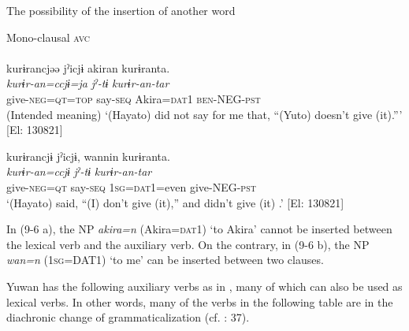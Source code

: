 \ea   The possibility of the insertion of another word \label{ex:9.6}

  \ea \label{ex:9.6a}Mono-clausal \textsc{avc}\\\\
 \glll  *kurɨrancjəə  jˀicjɨ  akiran  kurɨranta.\\
    \textit{kurɨr-an=ccjɨ=ja}  \textit{jˀ-tɨ}  \textit{}  \textit{kurɨr-an-tar}\\
    give-\textsc{neg}=\textsc{qt}=\textsc{top}  say-\textsc{seq}  Akira=\textsc{dat}1  \textsc{ben}-NEG-\textsc{pst}\\
    \glt     (Intended meaning) ‘(Hayato) did not say  for me that, “(Yuto) doesn’t give (it).”’ [El: 130821]

  \ex\label{ex:9.6b}

 \glll  kurɨrancjɨ  jˀicjɨ,  wannin  kurɨranta.\\
    \textit{kurɨr-an=ccjɨ}  \textit{jˀ-tɨ}  \textit{}  \textit{kurɨr-an-tar}\\
    give-\textsc{neg}=\textsc{qt}  say-\textsc{seq}  1\textsc{sg}=\textsc{dat}1=even  give-NEG-\textsc{pst}\\
    \glt     ‘(Hayato) said, “(I) don’t give (it),” and didn’t give (it) .’ [El: 130821]
    \z
\z

In (9-6 a), the NP \textit{akira=n} (Akira=\textsc{dat}1) ‘to Akira’ cannot be inserted between the lexical verb and the auxiliary verb. On the contrary, in (9-6 b), the NP \textit{wan=n} (1\textsc{sg}=DAT1) ‘to me’ can be inserted between two clauses.

Yuwan has the following auxiliary verbs as in , many of which can also be used as lexical verbs. In other words, many of the verbs in the following table are in the diachronic change of grammaticalization (cf. \citealt{Lehmann1995}: 37).

